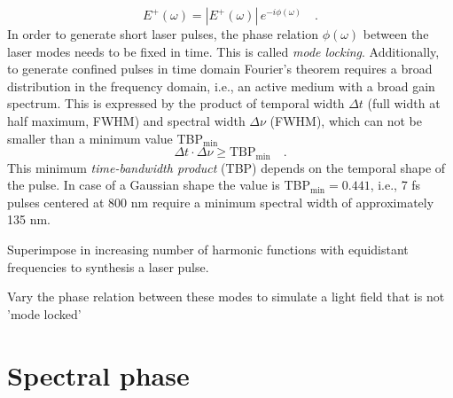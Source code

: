 \begin{equation}
	E^{+}(\omega) = | E^{+}(\omega) | \,  e^{- i \phi(\omega)} \quad .
\end{equation}
In order to generate short laser pulses, the phase relation $\phi(\omega)$ between the laser modes needs to be fixed in time. This is called \emph{mode locking}. Additionally, to generate confined pulses in time domain Fourier's theorem requires a broad distribution in the frequency domain, i.e., an active medium with a broad gain spectrum. This is expressed by the product of temporal width $\Delta t$ (full width at half maximum, FWHM) and spectral width $\Delta\nu$ (FWHM), which can not be smaller than a minimum value TBP$_{\text{min}}$
\begin{equation}
	\Delta t \cdot \Delta \nu \geq \text{TBP}_{\text{min}} \quad .
\end{equation}
This minimum \emph{time-bandwidth product} (TBP) depends on the temporal shape of the pulse. In case of a Gaussian shape the value is TBP$_{\text{min}} = 0.441$, i.e., 7 fs pulses centered at 800 nm require a minimum spectral width of approximately 135 nm.

\begin{questions}
	\item Superimpose in increasing number of harmonic functions with equidistant frequencies to synthesis a laser pulse.
	\item Vary the phase relation between these modes to simulate a light field that is not 'mode locked'
\end{questions}

\section{Spectral phase}

